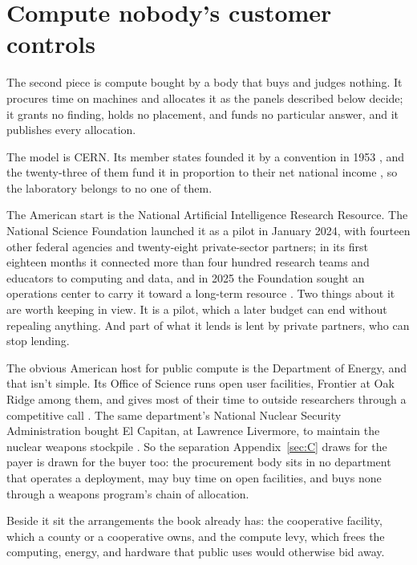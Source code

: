\section{Compute nobody's customer controls}
\label{sec:28.4}
The second piece is compute bought by a body that buys and judges nothing. It procures time on machines and allocates it as the panels described below decide; it grants no finding, holds no placement, and funds no particular answer, and it publishes every allocation.

The model is CERN. Its member states founded it by a convention in 1953 \autocite{cern1953convention}, and the twenty-three of them fund it in proportion to their net national income \autocite{cern2026participation}, so the laboratory belongs to no one of them.

The American start is the National Artificial Intelligence Research Resource. The National Science Foundation launched it as a pilot in January 2024, with fourteen other federal agencies and twenty-eight private-sector partners; in its first eighteen months it connected more than four hundred research teams and educators to computing and data, and in 2025 the Foundation sought an operations center to carry it toward a long-term resource \autocite{nsf2025nairroc}. Two things about it are worth keeping in view. It is a pilot, which a later budget can end without repealing anything. And part of what it lends is lent by private partners, who can stop lending.

The obvious American host for public compute is the Department of Energy, and that isn't simple. Its Office of Science runs open user facilities, Frontier at Oak Ridge among them, and gives most of their time to outside researchers through a competitive call \autocite{ornl2023incite}. The same department's National Nuclear Security Administration bought El Capitan, at Lawrence Livermore, to maintain the nuclear weapons stockpile \autocite{nnsa2019elcapitan}. So the separation Appendix~\ref{sec:C} draws for the payer is drawn for the buyer too: the procurement body sits in no department that operates a deployment, may buy time on open facilities, and buys none through a weapons program's chain of allocation.

Beside it sit the arrangements the book already has: the cooperative facility, which a county or a cooperative owns, and the compute levy, which frees the computing, energy, and hardware that public uses would otherwise bid away.
